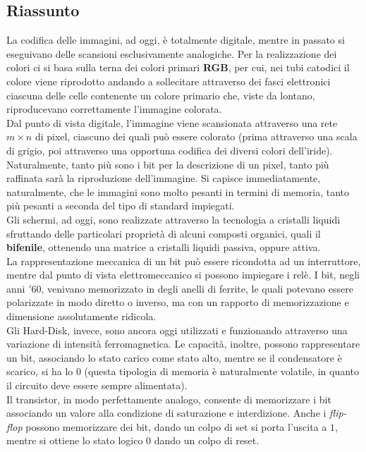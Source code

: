\documentclass[a4paper]{extarticle}
\begin{document}
\subsection{Riassunto}
La codifica delle immagini, ad oggi, è totalmente digitale, mentre in passato si eseguivano delle scansioni esclusivamente analogiche. Per la realizzazione dei colori ci si basa sulla terna dei colori primari \textbf{RGB}, per cui, nei tubi catodici il colore viene riprodotto andando a sollecitare attraverso dei fasci elettronici ciascuna delle celle contenente un colore primario che, viste da lontano, riproducevano correttamente l'immagine colorata.\\
Dal punto di vista digitale, l'immagine viene scansionata attraverso una rete \(m \times n\) di pixel, ciascuno dei quali può essere colorato (prima attraverso una scala di grigio, poi attraverso una opportuna codifica dei diversi colori dell'iride). Naturalmente, tanto più sono i bit per la descrizione di un pixel, tanto più raffinata sarà la riproduzione dell'immagine. Si capisce immediatamente, naturalmente, che le immagini sono molto pesanti in termini di memoria, tanto più pesanti a seconda del tipo di standard impiegati.\\
Gli schermi, ad oggi, sono realizzate attraverso la tecnologia a cristalli liquidi sfruttando delle particolari proprietà di alcuni composti organici, quali il \textbf{bifenile}, ottenendo una matrice a cristalli liquidi passiva, oppure attiva.\\
La rappresentazione meccanica di un bit può essere ricondotta ad un interruttore, mentre dal punto di vista elettromeccanico si possono impiegare i relè. I bit, negli anni \('60\), venivano memorizzato in degli anelli di ferrite, le quali potevano essere polarizzate in modo diretto o inverso, ma con un rapporto di memorizzazione e dimensione assolutamente ridicola.\\
Gli Hard-Disk, invece, sono ancora oggi utilizzati e funzionando attraverso una variazione di intensità ferromagnetica. Le capacità, inoltre, possono rappresentare un bit, associando lo stato carico come stato alto, mentre se il condensatore è scarico, si ha lo \(0\) (questa tipologia di memoria è naturalmente volatile, in quanto il circuito deve essere sempre alimentata).\\
Il transistor, in modo perfettamente analogo, consente di memorizzare i bit associando un valore alla condizione di saturazione e interdizione. Anche i \textit{flip-flop} possono memorizzare dei bit, dando un colpo di set si porta l'uscita a \(1\), mentre si ottiene lo stato logico \(0\) dando un colpo di reset.\\
\end{document}
